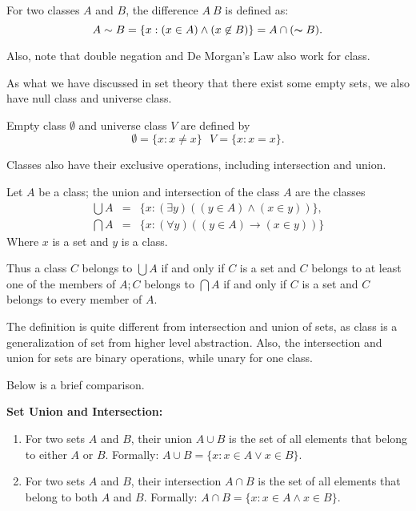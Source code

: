\begin{definition}
For two classes $A$ and $B$, the difference $A~B$ is defined as:
$$
A\sim B=\{x:(x\in A)\land(x\not\in B)\}=A\cap(\thicksim B).
$$
\end{definition}
Also, note that double negation and De Morgan's Law also work for class.

As what we have discussed in set theory that there exist some empty sets, we also have null class and
universe class.
\begin{definition}
    Empty class $\emptyset$ and universe class $V$ are defined by
    $$\emptyset=\{x:x\neq x\}\ \ \ V=\{x:x=x\}.$$
\end{definition}
Classes also have their exclusive operations, including intersection and union.
\begin{definition}
    Let $A$ be a class; the union and intersection of the class $A$ are
    the classes
    $$
    \begin{array}{rcl}\bigcup A&=&\{x:(\exists y)((y\in A)\land(x\in y))\},\\
        \bigcap A&=&\{x:(\forall y)((y\in A)\to (x\in y))\}\end{array}
    $$
    Where $x$ is a set and $y$ is a class.
\end{definition}
Thus a class $C$ belongs to $\bigcup A$ if and only if $C$ is a set and $C$ belongs to at least one of the 
members of $A;C$ belongs to $\bigcap A$ if and only if $C$ is a set and $C$ belongs to every member of $A.$

The definition is quite different from intersection and union of sets, as class is a generalization
of set from higher level abstraction. Also, the intersection and union for sets are binary operations,
while unary for one class. 

Below is a brief comparison.

\textbf{Set Union and Intersection:}
\begin{enumerate}
\item For two sets $A$ and $B$, their union $A \cup B$ is the set of all elements that belong to either $A$ or $B$. Formally: $A \cup B = \{x : x \in A \lor x \in B\}$.
\item For two sets $A$ and $B$, their intersection $A \cap B$ is the set of all elements that belong to both $A$ and $B$. Formally: $A \cap B = \{x : x \in A \land x \in B\}$.
\end{enumerate}

